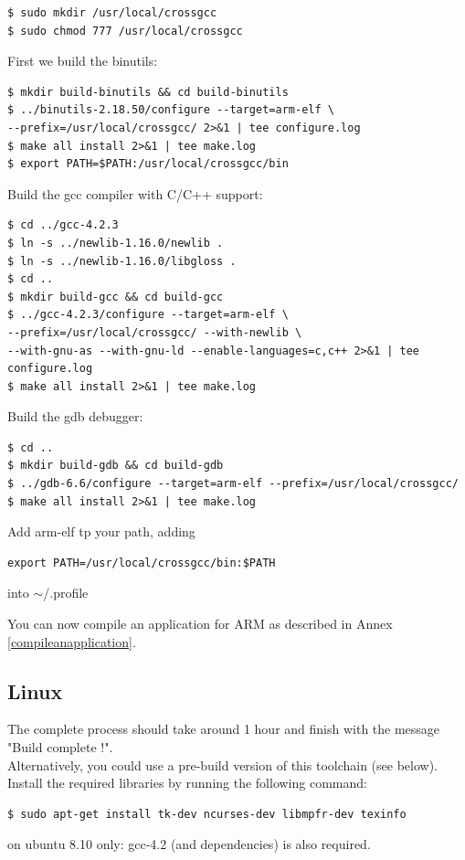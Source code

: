 \begin{verbatim}
$ sudo mkdir /usr/local/crossgcc
$ sudo chmod 777 /usr/local/crossgcc
\end{verbatim}

First we build the binutils:

\begin{verbatim}
$ mkdir build-binutils && cd build-binutils
$ ../binutils-2.18.50/configure --target=arm-elf \
--prefix=/usr/local/crossgcc/ 2>&1 | tee configure.log
$ make all install 2>&1 | tee make.log
$ export PATH=$PATH:/usr/local/crossgcc/bin
\end{verbatim}

Build the gcc compiler with C/C++ support:

\begin{verbatim}
$ cd ../gcc-4.2.3
$ ln -s ../newlib-1.16.0/newlib .
$ ln -s ../newlib-1.16.0/libgloss .
$ cd ..
$ mkdir build-gcc && cd build-gcc
$ ../gcc-4.2.3/configure --target=arm-elf \
--prefix=/usr/local/crossgcc/ --with-newlib \
--with-gnu-as --with-gnu-ld --enable-languages=c,c++ 2>&1 | tee configure.log
$ make all install 2>&1 | tee make.log
\end{verbatim}

Build the gdb debugger:

\begin{verbatim}
$ cd ..
$ mkdir build-gdb && cd build-gdb
$ ../gdb-6.6/configure --target=arm-elf --prefix=/usr/local/crossgcc/
$ make all install 2>&1 | tee make.log
\end{verbatim}

Add arm-elf tp your path, adding
\begin{verbatim}
export PATH=/usr/local/crossgcc/bin:$PATH
\end{verbatim}
into $\sim$/.profile

You can now compile an application for ARM as described in Annex \ref{compileanapplication}.

\subsection{Linux}
The complete process should take around 1 hour and finish with the message "Build complete !". \\
Alternatively, you could use a pre-build version of this toolchain (see below).\\

Install the required libraries by running the following command:
\begin{verbatim}
$ sudo apt-get install tk-dev ncurses-dev libmpfr-dev texinfo
\end{verbatim}
on ubuntu 8.10 only: gcc-4.2 (and dependencies) is also required.\\


